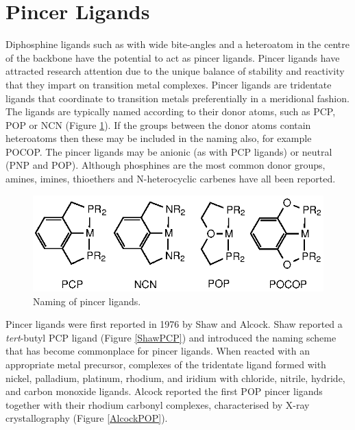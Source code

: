 \section{Pincer Ligands}

Diphosphine ligands such as \Phxantphos{} with wide bite-angles and a heteroatom in the centre of the backbone have the potential to act as pincer ligands.  Pincer ligands have attracted research attention due to the unique balance of stability and reactivity that they impart on transition metal complexes.\cite{Becerra2009}  Pincer ligands are tridentate ligands that coordinate to transition metals preferentially in a meridional fashion.\cite{Choi2011}   The ligands are typically named according to their donor atoms, such as PCP, POP or NCN (Figure \ref{Pincernaming}).  If the groups between the donor atoms contain heteroatoms then these may be included in the naming also, for example POCOP.  The pincer ligands may be anionic (as with PCP ligands) or neutral (PNP and POP).\cite{Vlugt2009, Kataoka1995}  Although phosphines are the most common donor groups, amines,\cite{Singleton2003} imines,\cite{Takenaka2005} thioethers\cite{Zim2000} and N-heterocyclic carbenes\cite{Hahn2007} have all been reported.

\begin{figure}[ht]
\centering
\includegraphics[]{../Figures/Pincernaming.eps}
\caption[Naming of pincer ligands]{Naming of pincer ligands.}
\label{Pincernaming}
\end{figure}

Pincer ligands were first reported in 1976 by Shaw\cite{Moulton1976} and Alcock.\cite{Alcock1976}  Shaw reported a \emph{tert}-butyl PCP ligand (Figure \ref{ShawPCP}) and introduced the naming scheme that has become commonplace for pincer ligands.  When reacted with an appropriate metal precursor, complexes of the tridentate ligand formed with nickel, palladium, platinum, rhodium, and iridium with chloride, nitrile, hydride, and carbon monoxide ligands.\cite{Moulton1976}  Alcock reported the first POP pincer ligands together with their rhodium carbonyl complexes, characterised by X-ray crystallography (Figure \ref{AlcockPOP}).\cite{Alcock1976}  

